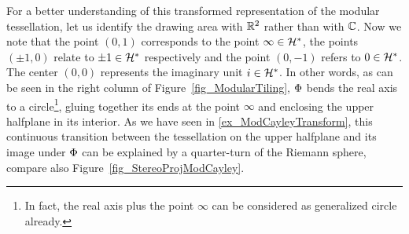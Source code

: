 For a better understanding of this transformed representation of the modular tessellation, let us identify the drawing area with $\mathbb{R}^2$ rather than with $\mathbb{C}$. Now we note that the point $(0,1)$ corresponds to the point $\infty \in \mathcal{H}^\ast$, the points $(\pm 1, 0)$ relate to $\pm 1 \in \mathcal{H}^\ast$ respectively and the point $(0,-1)$ refers to $0 \in \mathcal{H}^\ast$. The center $(0,0)$ represents the imaginary unit $i \in \mathcal{H}^\ast$. In other words, as can be seen in the right column of Figure~\ref{fig_ModularTiling}, $\Phi$ bends the real axis to a circle\footnote{In fact, the real axis plus the point $\infty$ can be considered as generalized circle already.}, gluing together its ends at the point $\infty$ and enclosing the upper halfplane in its interior. As we have seen in \ref{ex_ModCayleyTransform}, this continuous transition between the tessellation on the upper halfplane and its image under $\Phi$ can be explained by a quarter-turn of the Riemann sphere, compare also Figure~\ref{fig_StereoProjModCayley}.
